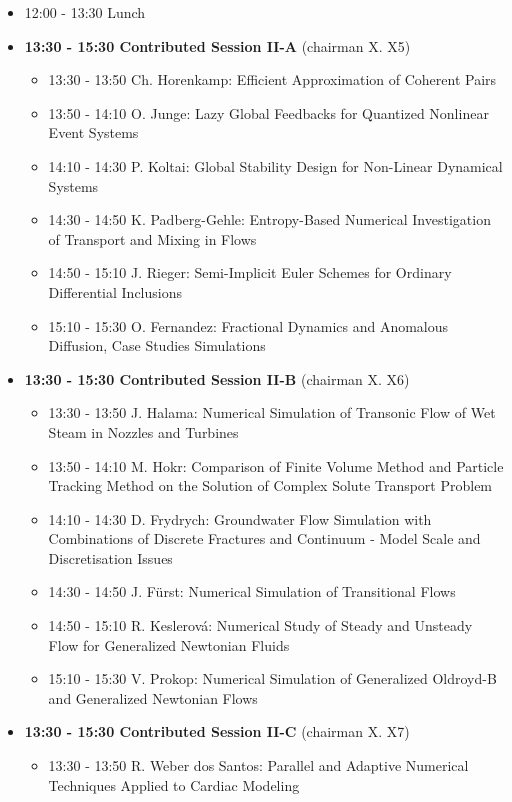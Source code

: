 \documentclass[10pt, A4]{article}%
\begin{document}
\begin{itemize}
\begin{itemize}
  \end{itemize}
  \item 12:00 - 13:30 Lunch
  \item {\bf 13:30 - 15:30 Contributed Session II-A} (chairman X. X5) 
  \begin{itemize}
    \item 13:30 - 13:50 Ch. Horenkamp: Efficient Approximation of Coherent Pairs
    \item 13:50 - 14:10 O. Junge: Lazy Global Feedbacks for Quantized Nonlinear Event Systems
    \item 14:10 - 14:30 P. Koltai: Global Stability Design for Non-Linear Dynamical Systems
    \item 14:30 - 14:50 K. Padberg-Gehle: Entropy-Based Numerical Investigation of Transport and Mixing in Flows
    \item 14:50 - 15:10 J. Rieger: Semi-Implicit Euler Schemes for Ordinary Differential Inclusions
    \item 15:10 - 15:30 O. Fernandez: Fractional Dynamics and Anomalous Diffusion, Case Studies Simulations
  \end{itemize}
  \item {\bf 13:30 - 15:30 Contributed Session II-B} (chairman X. X6) 
  \begin{itemize}
    \item 13:30 - 13:50 J. Halama: Numerical Simulation of Transonic Flow of Wet Steam in Nozzles and Turbines
    \item 13:50 - 14:10 M. Hokr: Comparison of Finite Volume Method and Particle Tracking Method on the Solution of Complex Solute Transport Problem
    \item 14:10 - 14:30 D. Frydrych: Groundwater Flow Simulation with Combinations of Discrete Fractures and Continuum - Model Scale and Discretisation Issues
    \item 14:30 - 14:50 J. F\"{u}rst: Numerical Simulation of Transitional Flows
    \item 14:50 - 15:10 R. Keslerov\'{a}: Numerical Study of Steady and Unsteady Flow for Generalized Newtonian Fluids
    \item 15:10 - 15:30 V. Prokop: Numerical Simulation of Generalized Oldroyd-B and Generalized Newtonian Flows
  \end{itemize}
    \item {\bf 13:30 - 15:30 Contributed Session II-C} (chairman X. X7) 
  \begin{itemize}
    \item 13:30 - 13:50 R. Weber dos Santos: Parallel and Adaptive Numerical Techniques Applied to Cardiac Modeling

\end{itemize}
\end{itemize}
\end{document}
